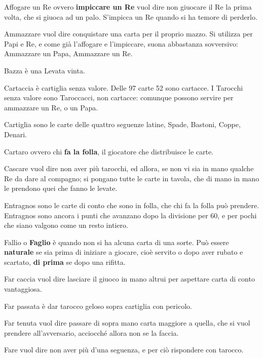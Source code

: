 \documentclass[11pt,a6paper]{article}
\begin{document}
\begin{list}
  {}
  {
  \setlength{\labelsep}{4pt}
  \setlength{\labelwidth}{14pt}
  \setlength{\topsep}{0pt}
  \setlength{\parsep}{0pt}
  \setlength{\parskip}{0pt}      
  \setlength{\itemsep}{0pt}
  \setlength{\leftmargin}{18pt}
  \setlength{\itemindent}{0pt}
  \let\makelabel=\textbf
  }
\item[Affogare un Re] ovvero \textbf{impiccare un Re} vuol dire non giuocare il Re la prima volta, che si giuoca ad un palo. S'impicca un Re quando si ha temore di perderlo.
\item[Ammazzare] vuol dire conquistare una carta per il proprio mazzo. Si utilizza per Papi e Re, e come già l'affogare e l'impiccare, suona abbastanza sovversivo: Ammazzare un Papa, Ammazzare un Re.
\item[Bazza] è una Levata vinta.
\item[Cartaccia] è cartiglia senza valore. Delle 97 carte 52 sono cartacce. I Tarocchi senza valore sono Taroccacci, non cartacce: comunque possono servire per ammazzare un Re, o un Papa.
\item[Cartiglia] sono le carte delle quattro seguenze latine, Spade, Bastoni, Coppe, Denari.
\item[Cartaro] ovvero chi \textbf{fa la folla}, il giocatore che distribuisce le carte.
\item[Cascare] vuol dire non aver più tarocchi, ed allora, se non vi sia in mano qualche Re da dare al compagno; si pongano tutte le carte in tavola, che di mano in mano le prendono quei che fanno le levate.
\item[Entragnos] sono le carte di conto che sono in folla, che chi fa la folla può prendere. Entragnos sono ancora i punti che avanzano dopo la divisione per 60, e per pochi che siano valgono come un resto intiero.
\item[Fallio] o \textbf{Faglio} è quando non si ha alcuna carta di una sorte. Può essere \textbf{naturale} se sia prima di iniziare a giocare, cioè servito o dopo aver rubato e scartato, \textbf{di prima} se dopo una rifitta.
\item[Far caccia] vuol dire lasciare il giuoco in mano altrui per aspettare carta di conto vantaggiosa.
\item[Far passata] è dar tarocco geloso sopra cartiglia con pericolo.
\item[Far tenuta] vuol dire passare di sopra mano carta maggiore a quella, che si vuol prendere all'avversario, acciocché allora non se la faccia.
\item[Fare] vuol dire non aver più d'una seguenza, e per ciò rispondere con tarocco.

\end{list}
\end{document}
